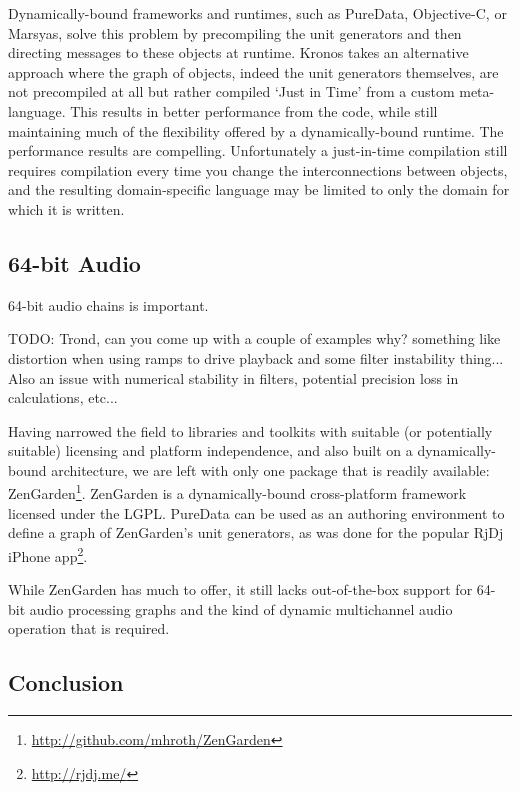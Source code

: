 \documentclass[twoside,10pt]{article}
\begin{document}
Dynamically-bound frameworks and runtimes, such as PureData, Objective-C, or Marsyas, solve this problem by precompiling the unit generators and then directing messages to these objects at runtime.  Kronos takes an alternative approach where the graph of objects, indeed the unit generators themselves, are not precompiled at all but rather compiled `Just in Time' from a custom meta-language. This results in better performance from the code, while still maintaining much of the flexibility offered by a dynamically-bound runtime.  The performance results are compelling.  Unfortunately a just-in-time compilation still requires compilation every time you change the interconnections between objects, and the resulting domain-specific language may be limited to only the domain for which it is written.



\subsection{64-bit Audio} %

64-bit audio chains is important.

TODO: Trond, can you come up with a couple of examples why?  something like distortion when using ramps to drive playback and some filter instability thing... Also an issue with numerical stability in filters, potential precision loss in calculations, etc...

Having narrowed the field to libraries and toolkits with suitable (or potentially suitable) licensing and platform independence, and also built on a dynamically-bound architecture, we are left with only one package that is readily available: ZenGarden\footnote{\url{http://github.com/mhroth/ZenGarden}}.  ZenGarden is a dynamically-bound cross-platform framework licensed under the LGPL.  PureData can be used as an authoring environment to define a graph of ZenGarden's unit generators, as was done for the popular RjDj iPhone app\footnote{\url{http://rjdj.me/}}.

While ZenGarden has much to offer, it still lacks out-of-the-box support for 64-bit audio processing graphs and the kind of dynamic multichannel audio operation that is required.



\subsection{Conclusion} %
\end{document}
